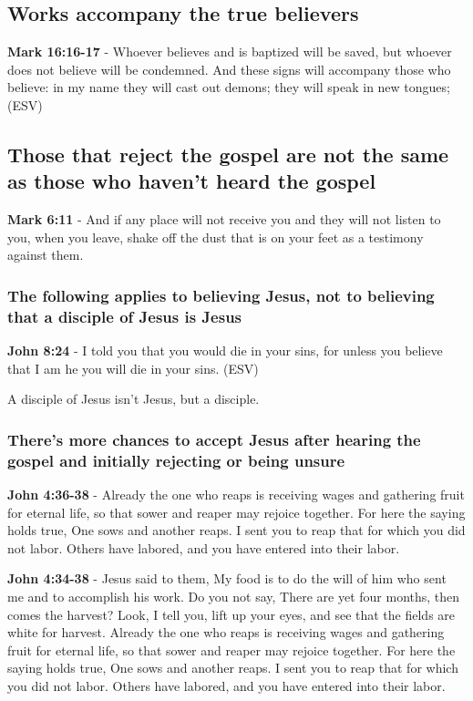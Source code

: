 \documentclass[11pt]{article}
\begin{document}
\subsection{Works accompany the true believers}
\label{sec:org936b906}
\textbf{Mark 16:16-17} - Whoever believes and is baptized will be saved, but whoever does not believe will be condemned. And these signs will accompany those who believe: in my name they will cast out demons; they will speak in new tongues; (ESV)

\subsection{Those that reject the gospel are not the same as those who haven't heard the gospel}
\label{sec:org29d3343}
\textbf{Mark 6:11} - And if any place will not receive you and they will not listen to you, when you leave, shake off the dust that is on your feet as a testimony against them.

\subsubsection{The following applies to believing Jesus, not to believing that a disciple of Jesus is Jesus}
\label{sec:org6fe9f66}
\textbf{John 8:24} - I told you that you would die in your sins, for unless you believe that I am he you will die in your sins.  (ESV)

A disciple of Jesus isn't Jesus, but a disciple.

\subsubsection{There's more chances to accept Jesus after hearing the gospel and initially rejecting or being unsure}
\label{sec:org8ce5ac6}

\textbf{John 4:36-38} - Already the one who reaps is receiving wages and gathering fruit for eternal life, so that sower and reaper may rejoice together. For here the saying holds true, One sows and another reaps. I sent you to reap that for which you did not labor. Others have labored, and you have entered into their labor.

\textbf{John 4:34-38} - Jesus said to them, My food is to do the will of him who sent me and to accomplish his work. Do you not say, There are yet four months, then comes the harvest? Look, I tell you, lift up your eyes, and see that the fields are white for harvest. Already the one who reaps is receiving wages and gathering fruit for eternal life, so that sower and reaper may rejoice together. For here the saying holds true, One sows and another reaps. I sent you to reap that for which you did not labor. Others have labored, and you have entered into their labor.
\end{document}
